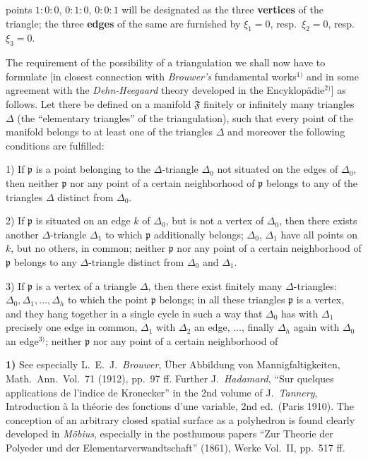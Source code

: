 \documentclass{article}
\begin{document}
points $1:0:0$, $0:1:0$, $0:0:1$ will be designated as the three \textbf{vertices} of the triangle; the three \textbf{edges} of the same are furnished by $\xi_1 = 0$, resp.\ $\xi_2 = 0$, resp.\ $\xi_3 = 0$.

The requirement of the possibility of a triangulation we shall now have to formulate [in closest connection with \emph{Brouwer's} fundamental works${}^{1)}$ and in some agreement with the \emph{Dehn-Heegaard} theory developed in the Encyklopädie${}^{2)}$] as follows. Let there be defined on a manifold $\mathfrak{F}$ finitely or infinitely many triangles $\Delta$ (the ``elementary triangles'' of the triangulation), such that every point of the manifold belongs to at least one of the triangles $\Delta$ and moreover the following conditions are fulfilled:


1) If $\mathfrak{p}$ is a point belonging to the $\Delta$-triangle $\Delta_0$ not situated on the edges of $\Delta_0$, then neither $\mathfrak{p}$ nor any point of a certain neighborhood of $\mathfrak{p}$ belongs to any of the triangles $\Delta$ distinct from $\Delta_0$.

2) If $\mathfrak{p}$ is situated on an edge $k$ of $\Delta_0$, but is not a vertex of $\Delta_0$, then there exists another $\Delta$-triangle $\Delta_1$ to which $\mathfrak{p}$ additionally belongs; $\Delta_0$, $\Delta_1$ have all points on $k$, but no others, in common; neither $\mathfrak{p}$ nor any point of a certain neighborhood of $\mathfrak{p}$ belongs to any $\Delta$-triangle distinct from $\Delta_0$ and $\Delta_1$.

3) If $\mathfrak{p}$ is a vertex of a triangle $\Delta$, then there exist finitely many $\Delta$-triangles: $\Delta_0, \Delta_1, \dots, \Delta_h$ to which the point $\mathfrak{p}$ belongs; in all these triangles $\mathfrak{p}$ is a vertex, and they hang together in a single cycle in such a way that $\Delta_0$ has with $\Delta_1$ precisely one edge in common, $\Delta_1$ with $\Delta_2$ an edge, $\dots$, finally $\Delta_h$ again with $\Delta_0$ an edge${}^{3)}$; neither $\mathfrak{p}$ nor any point of a certain neighborhood of

\textbf{1)} See especially L.~E.~J.~\emph{Brouwer}, Über Abbildung von Mannigfaltigkeiten, Math.\ Ann.\ Vol.~71 (1912), pp.~97 ff. Further J.~\emph{Hadamard}, ``Sur quelques applications de l'indice de Kronecker'' in the 2nd volume of J.~\emph{Tannery}, Introduction à la théorie des fonctions d'une variable, 2nd ed.\ (Paris 1910). The conception of an arbitrary closed spatial surface as a polyhedron is found clearly developed in \emph{Möbius}, especially in the posthumous papers ``Zur Theorie der Polyeder und der Elementarverwandtschaft'' (1861), Werke Vol.~II, pp.~517 ff.
\end{document}

